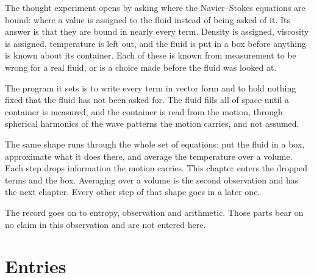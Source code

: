 The thought experiment opens by asking where the Navier--Stokes equations are bound: where a value
is assigned to the fluid instead of being asked of it. Its answer is that they are bound in nearly
every term. Density is assigned, viscosity is assigned, temperature is left out, and the fluid is
put in a box before anything is known about its container. Each of these is known from measurement
to be wrong for a real fluid, or is a choice made before the fluid was looked at.

The program it sets is to write every term in vector form and to hold nothing fixed that the fluid
has not been asked for. The fluid fills all of space until a container is measured, and the
container is read from the motion, through spherical harmonics of the wave patterns the motion
carries, and not assumed.

The same shape runs through the whole set of equations: put the fluid in a box, approximate what
it does there, and average the temperature over a volume. Each step drops information the motion
carries. This chapter enters the dropped terms and the box. Averaging over a volume is the second
observation and has the next chapter. Every other step of that shape goes in a later one.

The record goes on to entropy, observation and arithmetic. Those parts bear on no claim in this
observation and are not entered here.

\section{Entries}

